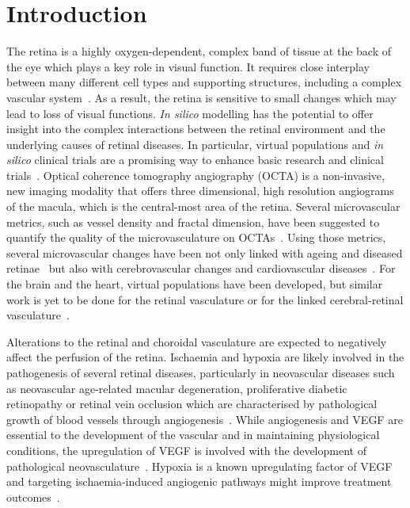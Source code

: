 \documentclass[11pt,]{article}
\begin{document}
\section{Introduction}\label{introduction}

The retina is a highly oxygen-dependent, complex band of tissue at the back of the eye which plays a key role in visual function.
It requires close interplay between many different cell types and supporting structures, including a complex vascular system~\cite{Hernandez2023}.
As a result, the retina is sensitive to small changes which may lead to loss of visual functions.
\textit{In silico} modelling has the potential to offer insight into the complex interactions between the retinal environment and the underlying causes of retinal diseases.
In particular, virtual populations and \textit{in silico} clinical trials are a promising way to enhance basic research and clinical trials~\cite{Hernandez2023}.
Optical coherence tomography angiography (OCTA) is a non-invasive, new imaging modality that offers three dimensional, high resolution angiograms of the macula, which is the central-most area of the retina.
Several microvascular metrics, such as vessel density and fractal dimension, have been suggested to quantify the quality of the microvasculature on OCTAs~\cite{Chu2016}.
Using those metrics, several microvascular changes have been not only linked with ageing and diseased retinae~\cite{ElBouri_2021,Ma2021,Trinh_2019,Told2023,Xue_2021} but also with cerebrovascular changes and cardiovascular diseases~\cite{Pleouras_2021,Graff_2021,LopezCuenca_2022}.
For the brain and the heart, virtual populations have been developed, but similar work is yet to be done for the retinal vasculature or for the linked cerebral-retinal vasculature~\cite{Hernandez2023}.

Alterations to the retinal and choroidal vasculature are expected to negatively affect the perfusion of the retina.
Ischaemia and hypoxia are likely involved in the pathogenesis of several retinal diseases, particularly in neovascular diseases such as neovascular age-related
macular degeneration, proliferative diabetic retinopathy or retinal
vein occlusion which are characterised by pathological growth of blood
vessels through angiogenesis~\cite{Medina_2016}.
While angiogenesis and VEGF are essential to the development of the vascular and in maintaining physiological conditions, the upregulation of VEGF is involved with the development of pathological neovasculature~\cite{Fruttiger_2007,Nishinaka_2018}. 
Hypoxia is a known upregulating factor of VEGF and targeting ischaemia-induced angiogenic pathways might improve treatment outcomes~\cite{UsuiOuchi2020}.
\end{document}
